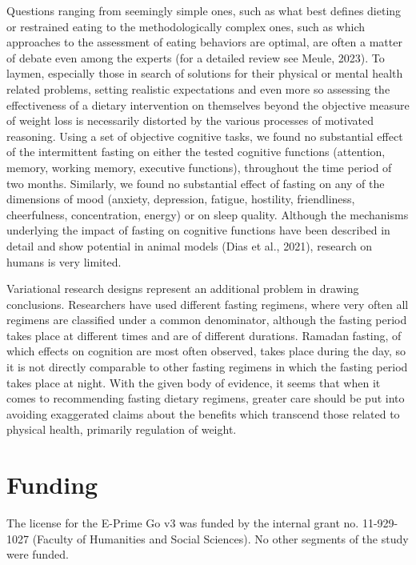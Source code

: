 \documentclass[authordate, empirical]{jote-new-article}
\begin{document}
Questions ranging from seemingly simple ones, such as what best defines dieting or restrained eating to the methodologically complex ones, such as which approaches to the assessment of eating behaviors are optimal, are often a matter of debate even among the experts (for a detailed review see Meule, 2023). To laymen, especially those in search of solutions for their physical or mental health related problems, setting realistic expectations and even more so assessing the effectiveness of a dietary intervention on themselves beyond the objective measure of weight loss is necessarily distorted by the various processes of motivated reasoning. Using a set of objective cognitive tasks, we found no substantial effect of the intermittent fasting on either the tested cognitive functions (attention, memory, working memory, executive functions), throughout the time period of two months. Similarly, we found no substantial effect of fasting on any of the dimensions of mood (anxiety, depression, fatigue, hostility, friendliness, cheerfulness, concentration, energy) or on sleep quality. Although the mechanisms underlying the impact of fasting on cognitive functions have been described in detail and show potential in animal models (Dias et al., 2021), research on humans is very limited.



Variational research designs represent an additional problem in drawing conclusions. Researchers have used different fasting regimens, where very often all regimens are classified under a common denominator, although the fasting period takes place at different times and are of different durations. Ramadan fasting, of which effects on cognition are most often observed, takes place during the day, so it is not directly comparable to other fasting regimens in which the fasting period takes place at night. With the given body of evidence, it seems that when it comes to recommending fasting dietary regimens, greater care should be put into avoiding exaggerated claims about the benefits which transcend those related to physical health, primarily regulation of weight.





\section{Funding}



The license for the E-Prime Go v3 was funded by the internal grant no. 11-929-1027 (Faculty of Humanities and Social Sciences). No other segments of the study were funded.
\end{document}
